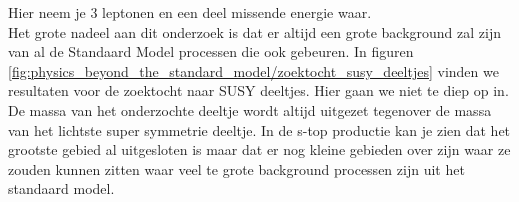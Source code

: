 \documentclass[../main.tex]{subfiles}
\begin{document}
Hier neem je 3 leptonen en een deel missende energie waar.\\
Het grote nadeel aan dit onderzoek is dat er altijd een grote background zal zijn van al de Standaard Model processen die ook gebeuren. In figuren \ref{fig:physics_beyond_the_standard_model/zoektocht_susy_deeltjes} vinden we resultaten voor de zoektocht naar SUSY deeltjes. Hier gaan we niet te diep op in. De massa van het onderzochte deeltje wordt altijd uitgezet tegenover de massa van het lichtste super symmetrie deeltje. In de s-top productie kan je zien dat het grootste gebied al uitgesloten is maar dat er nog kleine gebieden over zijn waar ze zouden kunnen zitten waar veel te grote background processen zijn uit het standaard model.

\begin{figure}[ht]
    \centering
    \hfill
    \hfill
    \\

\end{figure}
\end{document}
